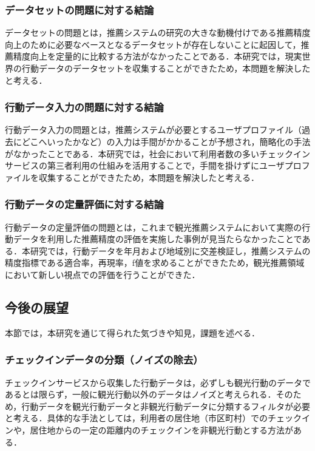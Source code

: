 \documentclass{jsarticle}
\begin{document}
\subsubsection{データセットの問題に対する結論}

データセットの問題とは，推薦システムの研究の大きな動機付けである推薦精度向上のために必要なベースとなるデータセットが存在しないことに起因して，推薦精度向上を定量的に比較する方法がなかったことである．本研究では，現実世界の行動データのデータセットを収集することができたため，本問題を解決したと考える．

\subsubsection{行動データ入力の問題に対する結論}

行動データ入力の問題とは，推薦システムが必要とするユーザプロファイル（過去にどこへいったかなど）の入力は手間がかかることが予想され，簡略化の手法がなかったことである．本研究では，社会において利用者数の多いチェックインサービスの第三者利用の仕組みを活用することで，手間を掛けずにユーザプロファイルを収集することができたため，本問題を解決したと考える．

\subsubsection{行動データの定量評価に対する結論}
行動データの定量評価の問題とは，これまで観光推薦システムにおいて実際の行動データを利用した推薦精度の評価を実施した事例が見当たらなかったことである．本研究では，行動データを年月および地域別に交差検証し，推薦システムの精度指標である適合率，再現率，f値を求めることができたため，観光推薦領域において新しい視点での評価を行うことができた．

\subsection{今後の展望}

本節では，本研究を通じて得られた気づきや知見，課題を述べる．

\subsubsection{チェックインデータの分類（ノイズの除去）}

チェックインサービスから収集した行動データは，必ずしも観光行動のデータであるとは限らず，一般に観光行動以外のデータはノイズと考えられる．そのため，行動データを観光行動データと非観光行動データに分類するフィルタが必要と考える．具体的な手法としては，利用者の居住地（市区町村）でのチェックインや，居住地からの一定の距離内のチェックインを非観光行動とする方法がある．
\end{document}
